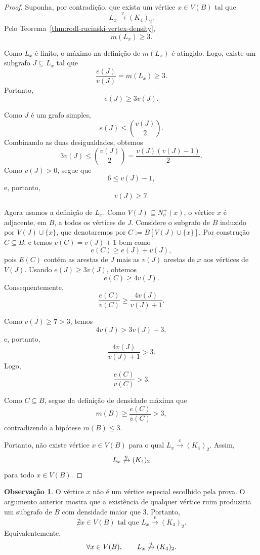 \documentclass[reqno, 12pt]{amsart}
\numberwithin{equation}{section}
\theoremstyle{plain}
\theoremstyle{definition}
\newtheorem{remark}[theorem]{Observação}
\begin{document}
\begin{proof}
  Suponha, por contradição, que exista um vértice
  $x\in V(B)$ tal que
  \[
    L_x\xrightarrow{v}(K_4)_2.
  \]
  Pelo Teorema~\ref{thm:rodl-rucinski-vertex-density},
  \[
    m(L_x)\geq 3.
  \]

  Como $L_x$ é finito, o máximo na definição de $m(L_x)$ é
  atingido. Logo, existe um subgrafo $J\subseteq L_x$ tal que
  \[
    \frac{e(J)}{v(J)}
    =
    m(L_x)
    \geq 3.
  \]
  Portanto,
  \[
    e(J)\geq 3v(J).
  \]

  Como $J$ é um grafo simples,
  \[
    e(J)\leq \binom{v(J)}{2}.
  \]
  Combinando as duas desigualdades, obtemos
  \[
    3v(J)
    \leq
    \binom{v(J)}{2}
    =
    \frac{v(J)(v(J)-1)}{2}.
  \]
  Como $v(J)>0$, segue que
  \[
    6\leq v(J)-1,
  \]
  e, portanto,
  \[
    v(J)\geq 7.
  \]

  Agora usamos a definição de $L_x$. Como $V(J)\subseteq N_\sigma^+(x)$,
  o vértice $x$ é adjacente, em $B$, a todos os vértices de $J$.
  Considere o subgrafo de $B$ induzido por $V(J)\cup\{x\}$, que
  denotaremos por $C := B[V(J)\cup\{x\}]$. Por construção $C\subseteq B$,
  e temos $v(C)=v(J)+1$ bem como
  \[
    e(C)\geq e(J)+v(J),
  \]
  pois $E(C)$ contém as arestas de $J$ mais as $v(J)$ arestas de $x$
  aos vértices de $V(J)$.
  Usando $e(J)\geq 3v(J)$, obtemos
  \[
    e(C)
    \geq
    4v(J).
  \]
  Consequentemente,
  \[
    \frac{e(C)}{v(C)}
    \geq
    \frac{4v(J)}{v(J)+1}.
  \]

  Como $v(J)\geq 7>3$, temos
  \[
    4v(J)>3v(J)+3,
  \]
  e, portanto,
  \[
    \frac{4v(J)}{v(J)+1}>3.
  \]
  Logo,
  \[
    \frac{e(C)}{v(C)}>3.
  \]

  Como $C\subseteq B$, segue da definição de densidade máxima que
  \[
    m(B)
    \geq
    \frac{e(C)}{v(C)}
    >
    3,
  \]
  contradizendo a hipótese $m(B)\leq 3$.

  Portanto, não existe vértice $x\in V(B)$ para o qual
  $L_x\xrightarrow{v}(K_4)_2$. Assim,
  \[
    L_x\not\xrightarrow{v}(K_4)_2
  \]
  para todo $x\in V(B)$.
\end{proof}

\begin{remark}
  \label{rem:quantificadores-todos-x}
  O vértice $x$ não é um vértice especial escolhido pela prova.
  O argumento anterior mostra que a existência de qualquer vértice
  ruim produziria um subgrafo de $B$ com densidade maior que $3$.
  Portanto,
  \[
    \nexists x\in V(B)
    \text{ tal que }
    L_x\xrightarrow{v}(K_4)_2.
  \]
  Equivalentemente,
  \[
    \forall x\in V(B),
    \qquad
    L_x\not\xrightarrow{v}(K_4)_2.
  \]
\end{remark}
\end{document}

